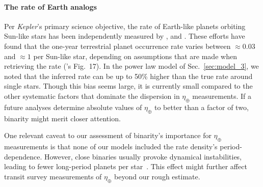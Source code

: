 \documentclass[12pt,modern]{aastex61}
\begin{document}

\paragraph{The rate of Earth analogs}
Per {\it Kepler}'s primary science objective, the rate of Earth-like planets 
orbiting Sun-like stars has been independently measured by 
\citet{youdin_exoplanet_2011,petigura_prevalence_2013,dong_fast_2013,
    foreman-mackey_exoplanet_2014}, and \citet{burke_terrestrial_2015}.
These efforts have found that the one-year terrestrial planet occurrence rate 
varies between $\approx 0.03$ and $\approx 1$ per Sun-like star, depending on 
assumptions that are made when retrieving the rate 
(\citealt{burke_terrestrial_2015}'s Fig.~17).
In the power law model of Sec.~\ref{sec:model_3}, we noted that the inferred 
rate can be up to 50\% higher than the true rate around single stars.
Though this bias seems large, it is currently small compared to the other 
systematic factors that dominate the dispersion in $\eta_\oplus$ 
measurements.
If a future analyses determine absolute values of $\eta_\oplus$ to 
better than a factor of two, binarity might merit closer attention.

One relevant caveat to our assessment of binarity's importance for 
$\eta_\oplus$ measurements is that none of our models 
included the rate density's period-dependence. However, close binaries usually
provoke dynamical instabilities, leading to fewer long-period planets per 
star~\citep[\textit{e.g.},][]{holman_long-term_1999,wang_influence_2014,
    kraus_impact_2016}.
This effect might further affect transit survey measurements of $\eta_\oplus$
beyond our rough estimate.
\end{document}
